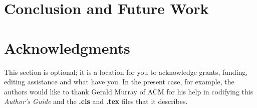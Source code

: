 \documentclass{acm_proc_article-sp}
\begin{document}
\section{Conclusion and Future Work}
\section{Acknowledgments}
This section is optional; it is a location for you
to acknowledge grants, funding, editing assistance and
what have you.  In the present case, for example, the
authors would like to thank Gerald Murray of ACM for
his help in codifying this \textit{Author's Guide}
and the \textbf{.cls} and \textbf{.tex} files that it describes.

%

%
%

\end{document}

